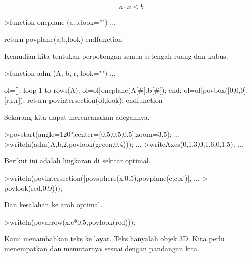 \documentclass{article}
\begin{document}
\begin{eulernotebook}
\begin{eulercomment}
\begin{eulercomment}
\begin{eulercomment}
\begin{eulercomment}
\begin{eulercomment}
\begin{eulercomment}
\begin{eulercomment}
\begin{eulercomment}
\begin{eulercomment}
\begin{eulercomment}
\begin{eulercomment}
\begin{eulercomment}
\begin{eulercomment}
\begin{eulercomment}
\begin{eulercomment}
\begin{eulercomment}
\begin{eulercomment}
\begin{eulercomment}
\begin{eulercomment}
\begin{eulercomment}
\begin{eulercomment}
\end{eulercomment}
\begin{eulerformula}
\[
a \cdot x \le b
\]
\end{eulerformula}
\begin{eulerprompt}
>function oneplane (a,b,look="") ...
\end{eulerprompt}
\begin{eulerudf}
    return povplane(a,b,look)
  endfunction
\end{eulerudf}
\begin{eulercomment}
Kemudian kita tentukan perpotongan semua setengah ruang dan kubus.
\end{eulercomment}
\begin{eulerprompt}
>function adm (A, b, r, look="") ...
\end{eulerprompt}
\begin{eulerudf}
    ol=[];
    loop 1 to rows(A); ol=ol|oneplane(A[#],b[#]); end;
    ol=ol|povbox([0,0,0],[r,r,r]);
    return povintersection(ol,look);
  endfunction
\end{eulerudf}
\begin{eulercomment}
Sekarang kita dapat merencanakan adegannya.
\end{eulercomment}
\begin{eulerprompt}
>povstart(angle=120°,center=[0.5,0.5,0.5],zoom=3.5); ...
>writeln(adm(A,b,2,povlook(green,0.4))); ...
>writeAxes(0,1.3,0,1.6,0,1.5); ...
\end{eulerprompt}
\begin{eulercomment}
Berikut ini adalah lingkaran di sekitar optimal.
\end{eulercomment}
\begin{eulerprompt}
>writeln(povintersection([povsphere(x,0.5),povplane(c,c.x')], ...
>  povlook(red,0.9)));
\end{eulerprompt}
\begin{eulercomment}
Dan kesalahan ke arah optimal.
\end{eulercomment}
\begin{eulerprompt}
>writeln(povarrow(x,c*0.5,povlook(red)));
\end{eulerprompt}
\begin{eulercomment}
Kami menambahkan teks ke layar. Teks hanyalah objek 3D. Kita perlu
menempatkan dan memutarnya sesuai dengan pandangan kita.
\end{eulercomment}

\end{eulercomment}
\end{eulercomment}
\end{eulercomment}
\end{eulercomment}
\end{eulercomment}
\end{eulercomment}
\end{eulercomment}
\end{eulercomment}
\end{eulercomment}
\end{eulercomment}
\end{eulercomment}
\end{eulercomment}
\end{eulercomment}
\end{eulercomment}
\end{eulercomment}
\end{eulercomment}
\end{eulercomment}
\end{eulercomment}
\end{eulercomment}
\end{eulercomment}
\end{eulernotebook}
\end{document}
